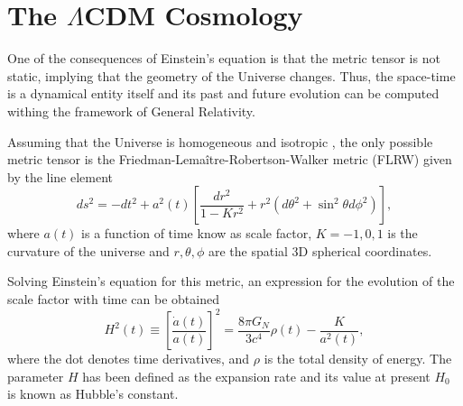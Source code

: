 \section{The $\Lambda$CDM Cosmology}
One of the consequences of Einstein's equation is that the metric tensor is not static, implying that the geometry of the Universe changes. Thus, the space-time is a dynamical entity itself and its past and future evolution can be computed withing the framework of General Relativity.
\newline

Assuming that the Universe is homogeneous and isotropic \citep{2014MNRAS.440...10A,2015MNRAS.449..670A}, the only possible metric tensor is the Friedman-Lema\^itre-Robertson-Walker metric (FLRW) given by the line element \cite{1927ASSB...47...49L}
\begin{equation}
ds^2 = -dt^2+a^2(t)\left[\frac{dr^2}{1-Kr^2}+r^2(d\theta^2+\sin^2\theta d\phi^2)\right],
\end{equation}
where $a(t)$ is a function of time know as scale factor, $K=-1,0,1$ is the curvature of the universe and $r,\theta,\phi$ are the spatial 3D spherical coordinates.
\newline

Solving Einstein's equation for this metric, an expression for the evolution of the scale factor with time can be obtained
\begin{equation}
H^2(t)\equiv \left[\frac{\dot a(t)}{a(t)}\right]^2 = \frac{8\pi G_N}{3c^4}\rho(t) -\frac{K}{a^2(t)},
\end{equation}
where the dot denotes time derivatives, and $\rho$ is the total density of energy. The parameter $H$ has been defined as the expansion rate and its value at present $H_0$ is known as Hubble's constant.
\newline

